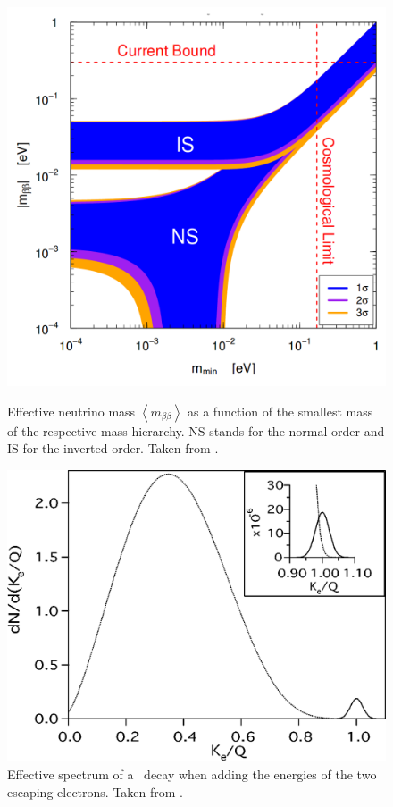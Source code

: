 \documentclass[encoding=utf8,british]{tumphthesis}
\begin{document}
\begin{figure}[t!]
	\centering
	\begin{minipage}[t]{.475\textwidth}
		\centering
		\includegraphics[width=.825\textwidth]{./Bilder/NeutrinoMassOrdering.png}
		\caption{Effective neutrino mass $\left\langle m_{\beta\beta}\right\rangle$ as a function of the smallest mass of the respective mass hierarchy. NS stands for the normal order and IS for the inverted order. Taken from \cite{bilenky_neutrinoless_2012}.}
		\label{fig:MassOrder}
	\end{minipage}\hfill%
	\begin{minipage}[t]{.475\textwidth}
		\centering
		\includegraphics[width=\textwidth]{./Bilder/TheoretischesSpektrmdes0nubbDecay.png}
		\caption{Effective spectrum of a \twonu\ decay when adding the energies of the two escaping electrons.  Taken from \cite{elliott_double_2002}.}
		\label{fig:TheoSpektrum}
	\end{minipage}
\end{figure}
\end{document}
